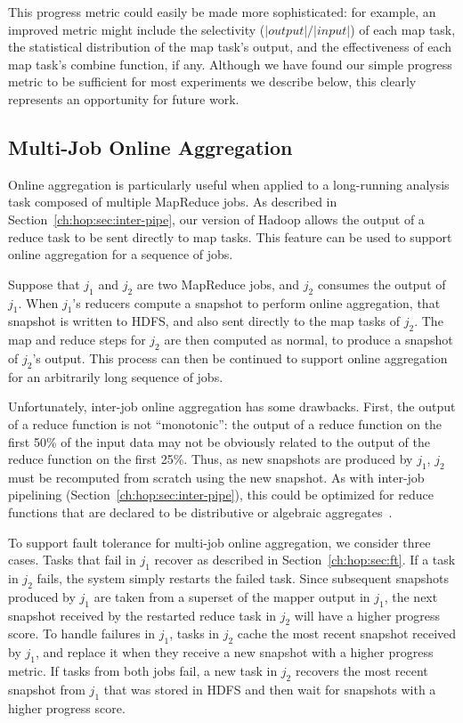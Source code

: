 This progress metric could easily be made more sophisticated: for example, an
improved metric might include the selectivity ($|output|/|input|$) of each map task, the
statistical distribution of the map task's output, and the effectiveness of each
map task's combine function, if any. 
Although we have found our simple progress metric to be
sufficient for most experiments we describe below, this clearly
represents an opportunity for future work.

\subsection{Multi-Job Online Aggregation}
\label{ch:hop:sec:online-multi}

Online aggregation is particularly useful when applied to a long-running
analysis task composed of multiple MapReduce jobs.  As described in
Section~\ref{ch:hop:sec:inter-pipe}, our version of Hadoop allows the output of
a reduce task to be sent directly to map tasks.  This feature can be used to
support online aggregation for a sequence of jobs.

Suppose that $j_1$ and $j_2$ are two MapReduce jobs, and $j_2$ consumes the
output of $j_1$.  When $j_1$'s reducers compute a snapshot to perform online
aggregation, that snapshot is written to HDFS, and also sent directly to the
map tasks of $j_2$.  The map and reduce steps for $j_2$ are then computed as
normal, to produce a snapshot of $j_2$'s output.  This process can then be
continued to support online aggregation for an arbitrarily long sequence of
jobs.
  
Unfortunately, inter-job online aggregation has some drawbacks.  First, the
output of a reduce function is not ``monotonic'': the output of a reduce
function on the first 50\% of the input data may not be obviously related to
the output of the reduce function on the first 25\%.  Thus, as new snapshots
are produced by $j_1$, $j_2$ must be recomputed from scratch using the new
snapshot.  As with inter-job pipelining (Section~\ref{ch:hop:sec:inter-pipe}),
this could be optimized for reduce functions that are declared to be
distributive or algebraic aggregates~\cite{datacube}.

To support fault tolerance for multi-job online aggregation, we consider three
cases. Tasks that fail in $j_1$ recover as described in Section~\ref{ch:hop:sec:ft}.
If a task in $j_2$ fails, the system simply restarts the failed task. Since
subsequent snapshots produced by $j_1$ are taken from a superset of the mapper
output in $j_1$, the next snapshot received by the restarted reduce task in
$j_2$ will have a higher progress score. To handle failures in $j_1$, tasks in
$j_2$ cache the most recent snapshot received by $j_1$, and replace it when they
receive a new snapshot with a higher progress metric. If tasks from both jobs
fail, a new task in $j_2$ recovers the most recent snapshot from $j_1$ that was
stored in HDFS and then wait for snapshots with a higher progress score.

